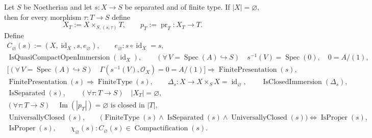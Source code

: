 \begin{definition}
  \label{def:nagata-noetherian-compactification}
  \lean{}

  Let $S$ be Noetherian and let $s\colon X\to S$ be separated and of finite
  type.  If $|X|=\varnothing$, then for every morphism
  $\tau\colon T\to S$ define
  \[
    X_T:=X\times_{S,(s,\tau)}T,\qquad
    p_T:=\operatorname{pr}_T\colon X_T\to T.
  \]
  Define
  \[
  \begin{gathered}
    C_\varnothing(s):=
      (X,\operatorname{id}_X,s,e_\varnothing),\qquad
    e_\varnothing\colon s\circ\operatorname{id}_X=s,\\
    \operatorname{IsQuasiCompactOpenImmersion}(\operatorname{id}_X),
    \qquad
    (\forall\,V=\operatorname{Spec}(A)\hookrightarrow S)\quad
      s^{-1}(V)=\operatorname{Spec}(0),\quad
      0=A/(1),\\
    \bigl[(\forall\,V=\operatorname{Spec}(A)\hookrightarrow S)\quad
      \Gamma(s^{-1}(V),\mathcal O_X)=0=A/(1)\bigr]
      \Longrightarrow\operatorname{FinitePresentation}(s),\\
    \operatorname{FinitePresentation}(s)
      \Longrightarrow\operatorname{FiniteType}(s),\qquad
    \Delta_s\colon X\to X\times_SX
      =\operatorname{id}_{\varnothing},\qquad
    \operatorname{IsClosedImmersion}(\Delta_s),\\
    \operatorname{IsSeparated}(s),\qquad
    (\forall\tau\colon T\to S)\quad |X_T|=\varnothing,\\
    (\forall\tau\colon T\to S)\quad
      \operatorname{Im}(|p_T|)=\varnothing
      \text{ is closed in }|T|,\\
    \operatorname{UniversallyClosed}(s),\qquad
    \bigl(\operatorname{FiniteType}(s)\wedge
      \operatorname{IsSeparated}(s)\wedge
      \operatorname{UniversallyClosed}(s)\bigr)
      \Longleftrightarrow\operatorname{IsProper}(s),\\
    \operatorname{IsProper}(s),\qquad
    \chi_\varnothing(s)\colon
      C_\varnothing(s)\in\operatorname{Compactification}(s).
  \end{gathered}                                                    \tag{NC0}
  \]


\end{definition}
